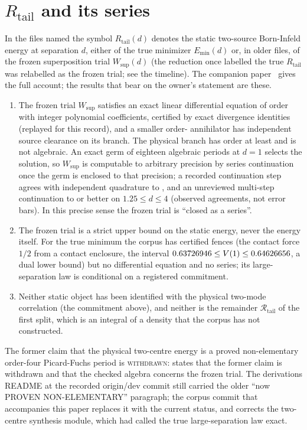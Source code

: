 \documentclass[aps,prd,onecolumn,amsmath,amssymb,longbibliography,floatfix,nofootinbib]{revtex4-2}
\newcommand{\Rtail}{\mathcal{R}_{\mathrm{tail}}}
\newcommand{\Wsup}{W_{\mathrm{sup}}}
\newcommand{\Emin}{E_{\min}}
\newcommand{\st}[1]{\textsc{#1}}
\begin{document}
\section{\texorpdfstring{$R_{\mathrm{tail}}$}{R_tail} and its series}
\label{sec:rtail}
In the files named  the symbol $R_{\mathrm{tail}}(d)$ denotes the static two-source Born-Infeld energy at separation $d$, either of the true minimizer $\Emin(d)$ or, in older files, of the frozen superposition trial $\Wsup(d)$ (the reduction once labelled the true $R_{\mathrm{tail}}$ was relabelled as the frozen trial; see the timeline). The companion paper~\cite{TwoCenterPaper} gives the full account; the results that bear on the owner's statement are these.
\begin{enumerate}
\item The frozen trial $\Wsup$ satisfies an exact linear differential equation of order \EnergyOrderVal{} with integer polynomial coefficients, certified by exact divergence identities (replayed for this record), and a smaller order-\OrderSeventeenVal{} annihilator has independent source clearance on its branch. The physical branch has order at least \SelectedLowerVal{} and is not algebraic. An exact germ of eighteen algebraic periods at $d=1$ selects the solution, so $\Wsup$ is computable to arbitrary precision by series continuation once the germ is enclosed to that precision; a recorded continuation step agrees with independent quadrature to \IvpErrVal{}, and an unreviewed multi-step continuation to \BondDiffMaxVal{} or better on $1.25\le d\le4$ (observed agreements, not error bars). In this precise sense the frozen trial is ``closed as a series''.
\item The frozen trial is a strict upper bound on the static energy, never the energy itself. For the true minimum the corpus has certified fences (the contact force $1/2$ from a contact enclosure, the interval $0.63726946\le V(1)\le0.64626656$, a dual lower bound) but no differential equation and no series; its large-separation law is conditional on a registered commitment.
\item Neither static object has been identified with the physical two-mode correlation (the commitment above), and neither is the remainder $\Rtail$ of the first split, which is an integral of a density that the corpus has not constructed.
\end{enumerate}
The former claim that the physical two-centre energy is a proved non-elementary order-four Picard-Fuchs period is \st{withdrawn}:  states that the former claim is withdrawn and that the checked algebra concerns the frozen trial. The derivations README at the recorded origin/dev commit still carried the older ``now PROVEN NON-ELEMENTARY'' paragraph; the corpus commit that accompanies this paper replaces it with the current status, and corrects the two-centre synthesis module, which had called the true large-separation law exact.
\end{document}
